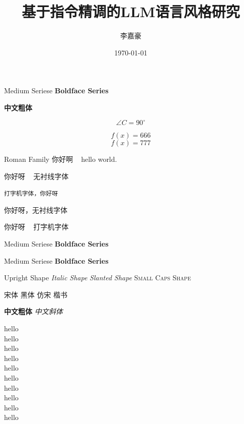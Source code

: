 \documentclass[8pt]{article}
\title{\heiti 基于指令精调的LLM语言风格研究}
\author{\kaishu 李嘉豪}
\date{\today}
\newcommand{\degree}{^\circ}
\begin{document}
	\maketitle
	
	\tableofcontents
	
	{\mdseries Medium Seriese}
	{\bfseries Boldface Series}
	
	\textbf{中文粗体}
	
	$$
		\angle C=90\degree
	$$

	\begin{equation}
		f(x)=666
	\end{equation}
	\begin{equation}
		f(x)=777
	\end{equation}
	
	
	\textrm{Roman Family 你好啊 ~ hello world.}
	
	\textsf{你好呀 ~ 无衬线字体}
	
	\texttt{打字机字体，你好呀 ~ }
	
	
	
	
	{\sffamily 你好呀，无衬线字体}
	
	{\ttfamily 你好呀 ~ 打字机字体}
	  
	\textmd{Medium Seriese}
	\textbf{Boldface Series}
	
	{\mdseries Medium Seriese}
	{\bfseries Boldface Series}
	
	{\upshape Upright Shape}
	{\itshape Italic Shape}
	{\slshape Slanted Shape}
	{\scshape Small Caps Shape}
	
	{\songti 宋体}
	{\quad}
	{\heiti 黑体}
	{\quad}
	{\fangsong 仿宋}
	{\quad}
	{\kaishu 楷书}
	
	\textbf{\songti 中文粗体}
	{\quad}
	\textit{中文斜体}
	
	
	{\tiny hello} \\
	{\scriptsize hello} \\
	{\footnotesize hello} \\
	{\small hello} \\
	{\normalsize hello} \\
	{\large hello} \\
	{\Large hello} \\
	{\LARGE hello} \\
	{\huge hello} \\
	{\Huge hello} 
	
\end{document}
